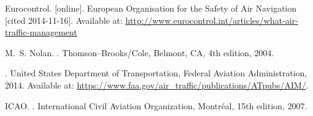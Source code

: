 \begin{thebibliography}{1}

Eurocontrol.
 [online].
\newblock European Organisation for the Safety of Air Navigation [cited 2014-11-16].
\newblock Available at: \url{http://www.eurocontrol.int/articles/what-air-traffic-management}

M.~S. Nolan.
.
\newblock Thomson--Brooks/Cole, Belmont, CA, 4th edition, 2004.

.
\newblock United States Department of Transportation, Federal Aviation Administration, 2014.
\newblock Available at: \url{https://www.faa.gov/air_traffic/publications/ATpubs/AIM/}.

ICAO.
.
\newblock International Civil Aviation Organization, Montréal, 15th edition, 2007.






\end{thebibliography}
